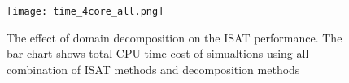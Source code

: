 \begin{figure}[htbp]
    \centering
\texttt{[image: time\_4core\_all.png]} 

\caption{The effect of domain decomposition on the ISAT performance. The bar chart shows total CPU time cost of simualtions using all combination of ISAT methods and decomposition methods}\label{MPI_4core_all} 
\end{figure}


